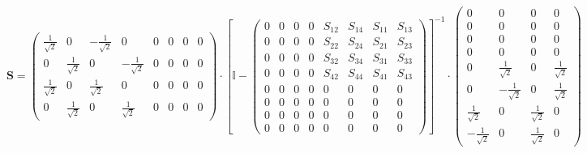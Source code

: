 \documentclass[10pt]{article} \usepackage{amsmath} \usepackage{bbold}
\begin{document}
\[ \mathbf{S} = \left(\begin{smallmatrix} \frac{1}{\sqrt{2}} & 0 &
-\frac{1}{\sqrt{2}} & 0 & 0 & 0 & 0 & 0 \\ 0 & \frac{1}{\sqrt{2}} & 0
& -\frac{1}{\sqrt{2}} & 0 & 0 & 0 & 0 \\ \frac{1}{\sqrt{2}} & 0 &
\frac{1}{\sqrt{2}} & 0 & 0 & 0 & 0 & 0 \\ 0 & \frac{1}{\sqrt{2}} & 0 &
\frac{1}{\sqrt{2}} & 0 & 0 & 0 & 0 \end{smallmatrix}\right) \cdot
\left[ \mathbb{I}  - \left(\begin{smallmatrix} 0 & 0 & 0 & 0 & S_{12}
& S_{14} & S_{11} & S_{13} \\ 0 & 0 & 0 & 0 & S_{22} & S_{24} & S_{21}
& S_{23} \\ 0 & 0 & 0 & 0 & S_{32} & S_{34} & S_{31} & S_{33} \\ 0 & 0
& 0 & 0 & S_{42} & S_{44} & S_{41} & S_{43} \\ 0 & 0 & 0 & 0 & 0 & 0 &
0 & 0 \\ 0 & 0 & 0 & 0 & 0 & 0 & 0 & 0 \\ 0 & 0 & 0 & 0 & 0 & 0 & 0 &
0 \\ 0 & 0 & 0 & 0 & 0 & 0 & 0 & 0 \end{smallmatrix}\right)
\right]^{-1} \cdot\left(\begin{smallmatrix} 0 & 0 & 0 & 0 \\ 0 & 0 & 0
& 0 \\ 0 & 0 & 0 & 0 \\ 0 & 0 & 0 & 0 \\ 0 & \frac{1}{\sqrt{2}} & 0 &
\frac{1}{\sqrt{2}} \\ 0 & -\frac{1}{\sqrt{2}} & 0 & \frac{1}{\sqrt{2}}
\\ \frac{1}{\sqrt{2}} & 0 & \frac{1}{\sqrt{2}} & 0 \\
-\frac{1}{\sqrt{2}} & 0 & \frac{1}{\sqrt{2}} & 0
\end{smallmatrix}\right) \]
\end{document}
